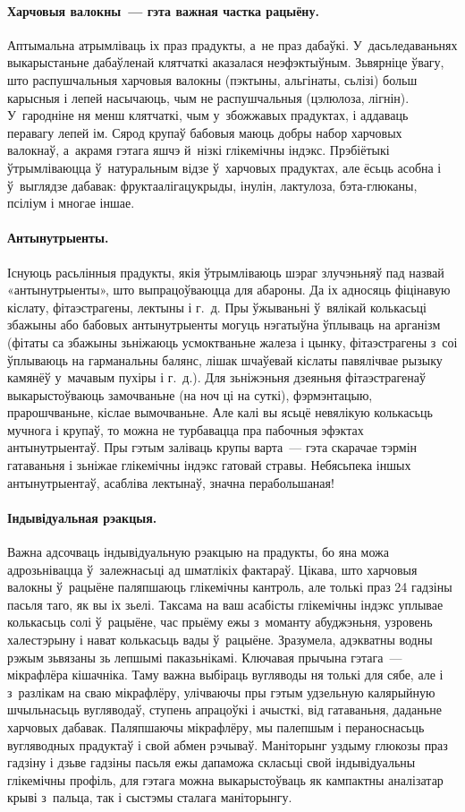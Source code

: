 \paragraph{Харчовыя валокны~--- гэта важная частка рацыёну.}
Аптымальна атрымліваць іх праз прадукты, а~не праз дабаўкі. У~дасьледаваньнях выкарыстаньне дабаўленай клятчаткі аказалася неэфэктыўным. Зьвярніце ўвагу, што распушчальныя харчовыя валокны (пэктыны, альгінаты, сьлізі) больш карысныя і лепей насычаюць, чым не распушчальныя (цэлюлоза, лігнін). У~гародніне ня менш клятчаткі, чым у~збожжавых прадуктах, і аддаваць перавагу лепей ім. Сярод крупаў бабовыя маюць добры набор харчовых валокнаў, а~акрамя гэтага яшчэ й~нізкі глікемічны індэкс. Прэбіётыкі ўтрымліваюцца ў~натуральным відзе ў~харчовых прадуктах, але ёсьць асобна і ў~выглядзе дабавак: фруктаалігацукрыды, інулін, лактулоза, бэта-глюканы, псіліум і многае іншае.

\paragraph{Антынутрыенты.}
Існуюць расьлінныя прадукты, якія ўтрымліваюць шэраг злучэньняў пад назвай «антынутрыенты», што выпрацоўваюцца для абароны. Да іх адносяць фіцінавую кіслату, фітаэстрагены, лектыны і г.~д. Пры ўжываньні ў~вялікай колькасьці збажыны або бабовых антынутрыенты могуць нэгатыўна ўплываць на арганізм (фітаты са збажыны зьніжаюць усмоктваньне жалеза і цынку, фітаэстрагены з~соі ўплываюць на гарманальны балянс, лішак шчаўевай кіслаты павялічвае рызыку камянёў у~мачавым пухіры і г.~д.). Для зьніжэньня дзеяньня фітаэстрагенаў выкарыстоўваюць замочваньне (на ноч ці на суткі), фэрмэнтацыю, прарошчваньне, кіслае вымочваньне. Але калі вы ясьцё невялікую колькасьць мучнога і крупаў, то можна не турбавацца пра пабочныя эфэктах антынутрыентаў. Пры гэтым заліваць крупы варта~--- гэта скарачае тэрмін гатаваньня і зьніжае глікемічны індэкс гатовай стравы. Небясьпека іншых антынутрыентаў, асабліва лектынаў, значна перабольшаная!

\paragraph{Індывідуальная рэакцыя.}
Важна адсочваць індывідуальную рэакцыю на прадукты, бо яна можа адрозьнівацца ў~залежнасьці ад шматлікіх фактараў. Цікава, што харчовыя валокны ў~рацыёне паляпшаюць глікемічны кантроль, але толькі праз 24 гадзіны пасьля таго, як вы іх зьелі. Таксама на ваш асабісты глікемічны індэкс уплывае колькасьць солі ў~рацыёне, час прыёму ежы з~моманту абуджэньня, узровень халестэрыну і нават колькасьць вады ў~рацыёне. Зразумела, адэкватны водны рэжым зьвязаны зь лепшымі паказьнікамі. Ключавая прычына гэтага~--- мікрафлёра кішачніка. Таму важна выбіраць вугляводы ня толькі для сябе, але і з~разлікам на сваю мікрафлёру, улічваючы пры гэтым удзельную калярыйную шчыльнасьць вугляводаў, ступень апрацоўкі і ачысткі, від гатаваньня, даданьне харчовых дабавак. Паляпшаючы мікрафлёру, мы палепшым і пераноснасьць вугляводных прадуктаў і свой абмен рэчываў. Маніторынг уздыму глюкозы праз гадзіну і дзьве гадзіны пасьля ежы дапаможа скласьці свой індывідуальны глікемічны профіль, для гэтага можна выкарыстоўваць як кампактны аналізатар крыві з~пальца, так і сыстэмы сталага маніторынгу.

